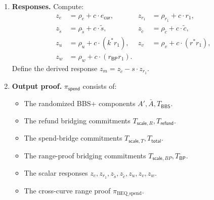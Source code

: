 \documentclass[11pt]{article}
\theoremstyle{definitionstyle}
\theoremstyle{plain}
\begin{document}
\begin{enumerate}[leftmargin=*]
\[\begin{aligned}
    &\parallel A' \parallel \bar{A} \parallel T_{\mathsf{BBS}}
    \parallel T_{\mathsf{scale},R} \parallel T_{\mathsf{refund}} \\
    &\parallel T_{\mathsf{scale},T} \parallel T_{\mathsf{total}}
    \parallel T_{\mathsf{scale},BP} \parallel T_{\mathsf{BP}} \parallel \text{``Spend''}
  \bigr).
  \end{aligned}
  \]
\item \textbf{Responses.}
  Compute:
  \begin{align*}
    z_e &= \rho_e + c \cdot e_{\mathsf{cur}}, & z_{r_1} &= \rho_{r_1} + c \cdot r_1, \\
    z_{\tilde{s}} &= \rho_{\tilde{s}} + c \cdot \tilde{s}, & z_{\tilde{c}} &= \rho_{\tilde{c}} + c \cdot \tilde{c}, \\
    z_u &= \rho_u + c \cdot (k^* r_1), & z_v &= \rho_v + c \cdot (r^* r_1), \\
    z_w &= \rho_w + c \cdot (r_{\mathsf{BP}} r_1).
  \end{align*}
  Define the derived response $z_m = z_{\tilde{c}} - s \cdot z_{r_1}$.
\item \textbf{Output proof.}
  $\pi_{\mathsf{spend}}$ consists of:
  \begin{itemize}[leftmargin=*, nosep]
  \item The randomized BBS+ components $A', \bar{A}, T_{\mathsf{BBS}}$.
  \item The refund bridging commitments $T_{\mathsf{scale},R}, T_{\mathsf{refund}}$.
  \item The spend-bridge commitments $T_{\mathsf{scale},T}, T_{\mathsf{total}}$.
  \item The range-proof bridging commitments $T_{\mathsf{scale},BP}, T_{\mathsf{BP}}$.
  \item The scalar responses $z_e, z_{r_1}, z_{\tilde{s}}, z_{\tilde{c}}, z_u, z_v, z_w$.
  \item The cross-curve range proof $\pi_{\text{BEQ\_spend}}$.
  \end{itemize}
\end{enumerate}
\end{document}
